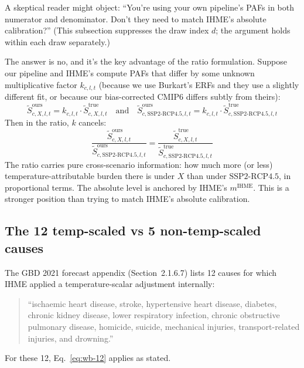 \documentclass[11pt]{article}
\newcommand{\SSPtwo}{\text{SSP2{-}RCP4.5}}
\newcommand{\mIHME}{m^{\text{IHME}}}
\begin{document}
A skeptical reader might object: ``You're using your own pipeline's PAFs
in both numerator and denominator. Don't they need to match IHME's
absolute calibration?'' (This subsection suppresses the draw index $d$;
the argument holds within each draw separately.)

The answer is no, and it's the key advantage of the ratio formulation.
Suppose our pipeline and IHME's compute PAFs that differ by some
unknown multiplicative factor $k_{c,l,t}$ (because we use Burkart's ERFs
and they use a slightly different fit, or because our bias-corrected
CMIP6 differs subtly from theirs):
\begin{equation*}
\tilde S^{\text{ours}}_{c,X,l,t} = k_{c,l,t} \cdot \tilde S^{\text{true}}_{c,X,l,t}
\quad\text{and}\quad
\tilde S^{\text{ours}}_{c,\SSPtwo,l,t} = k_{c,l,t} \cdot \tilde S^{\text{true}}_{c,\SSPtwo,l,t}
\end{equation*}
Then in the ratio, $k$ cancels:
\begin{equation*}
\frac{\tilde S^{\text{ours}}_{c,X,l,t}}{\tilde S^{\text{ours}}_{c,\SSPtwo,l,t}}
= \frac{\tilde S^{\text{true}}_{c,X,l,t}}{\tilde S^{\text{true}}_{c,\SSPtwo,l,t}}
\end{equation*}
The ratio carries pure cross-scenario information: how much more (or
less) temperature-attributable burden there is under $X$ than under
$\SSPtwo$, in proportional terms. The absolute level is anchored by
IHME's $\mIHME$. This is a stronger position than trying to match IHME's
absolute calibration.

\subsection{The 12 temp-scaled vs 5 non-temp-scaled causes}

The GBD 2021 forecast appendix (Section~2.1.6.7) lists 12 causes for
which IHME applied a temperature-scalar adjustment internally:
\begin{quote}
``ischaemic heart disease, stroke, hypertensive heart disease, diabetes,
chronic kidney disease, lower respiratory infection, chronic obstructive
pulmonary disease, homicide, suicide, mechanical injuries,
transport-related injuries, and drowning.''
\end{quote}
For these 12, Eq.~\eqref{eq:wb-12} applies as stated.
\end{document}
